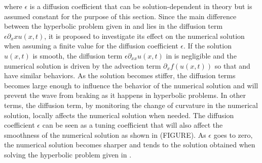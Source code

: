 where $\epsilon$ is a diffusion coefficient that can be solution-dependent in theory but is assumed constant for the purpose of this section. Since the main difference between the hyperbolic problem given in  and  lies in the diffusion term $\epsilon \partial_xx u(x,t)$, it is proposed to investigate its effect on the numerical solution when assuming a finite value for the diffusion coefficient $\epsilon$. If the solution $u(x,t)$ is smooth, the diffusion term $\epsilon \partial_{xx} u(x,t)$ in  is negligible and the numerical solution is driven by the advection term $\partial_x f(u(x,t))$ so that  and  have similar behaviors. As the solution becomes stiffer, the diffusion terms becomes large enough to influence the behavior of the numerical solution and will prevent the wave from braking as it happens in hyperbolic problems. In other terms, the diffusion term, by monitoring the change of curvature in the numerical solution, locally affects the numerical solution when needed. The diffusion coefficient $\epsilon$ can be seen as a tuning coefficient that will also affect the smoothness of the numerical solution as shown in (FIGURE). As $\epsilon$ goes to zero, the numerical solution becomes sharper and tends to the solution obtained when solving the hyperbolic problem given in . 


